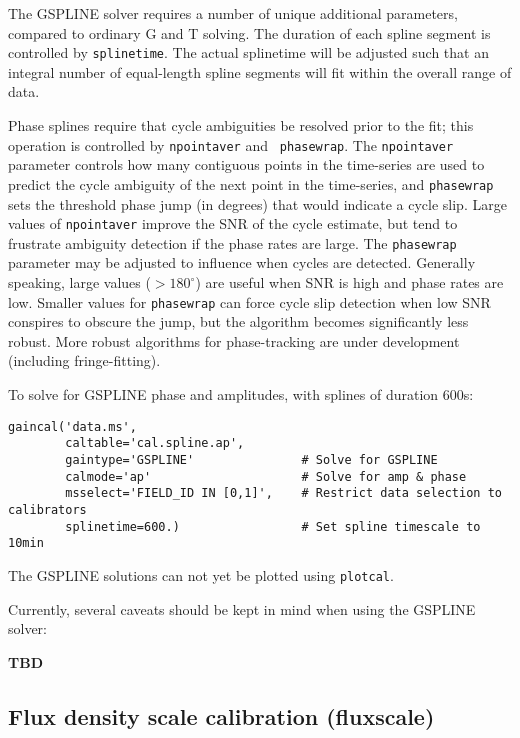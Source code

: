 The GSPLINE solver requires a number of unique additional parameters,
compared to ordinary G and T solving.  The duration of each spline 
segment is controlled by {\tt splinetime}.  The actual splinetime will be 
adjusted such that an integral number of equal-length spline segments
will fit within the overall range of data.

Phase splines require that cycle ambiguities be resolved prior to the
fit; this operation is controlled by {\tt npointaver} and {\tt
phasewrap}.  The {\tt npointaver} parameter controls how many
contiguous points in the time-series are used to predict the cycle
ambiguity of the next point in the time-series, and {\tt phasewrap} sets
the threshold phase jump (in degrees) that would indicate a cycle
slip.  Large values of {\tt npointaver} improve the SNR of the cycle
estimate, but tend to frustrate ambiguity detection if the phase rates
are large.  The {\tt phasewrap} parameter may be adjusted to influence
when cycles are detected.  Generally speaking, large values
($>180^\circ$) are useful when SNR is high and phase rates are
low. Smaller values for {\tt phasewrap} can force cycle slip detection
when low SNR conspires to obscure the jump, but the algorithm becomes
significantly less robust.  More robust algorithms for phase-tracking
are under development (including fringe-fitting).

To solve for GSPLINE phase and amplitudes, with splines of duration 600s:

\small
\begin{verbatim}
gaincal('data.ms',
        caltable='cal.spline.ap',
        gaintype='GSPLINE'               # Solve for GSPLINE
        calmode='ap'                     # Solve for amp & phase
        msselect='FIELD_ID IN [0,1]',    # Restrict data selection to calibrators
        splinetime=600.)                 # Set spline timescale to 10min
\end{verbatim}
\normalsize


The GSPLINE solutions can not yet be plotted using {\tt plotcal}.

Currently, several caveats should be kept in mind when using the GSPLINE
solver:

  {\bf TBD}

\subsection{Flux density scale calibration ({\rm fluxscale})}
\label{subsection:synth.fluxscale}

